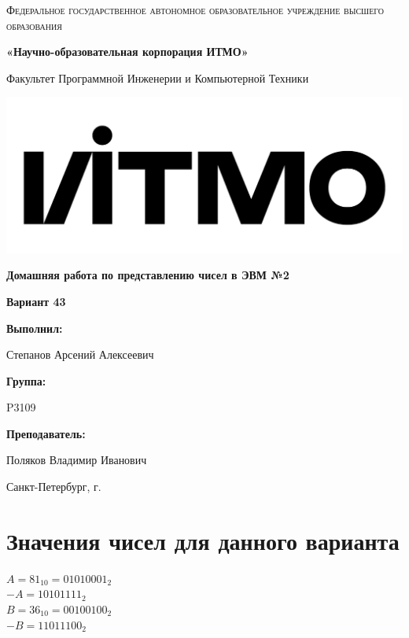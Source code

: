 \documentclass[12pt,a4paper]{report}
\begin{document}
\begin{titlepage}
	\centering
	{
        \scshape
        Федеральное государственное автономное образовательное учреждение высшего образования
        \par
        \textbf{«Научно-образовательная корпорация ИТМО»}
        \par
        \vspace*{1cm}
        Факультет Программной Инженерии и Компьютерной Техники
        \par
    }
    \vspace*{0.6cm}
    \includegraphics[width=\textwidth]{logo.png}
    {
        \Large
        \textbf{Домашняя работа по представлению чисел в ЭВМ №2}
        \par
        \normalsize
        \vspace*{0.75cm}
        \textbf{Вариант 43}
        \par
    }
    \vfill
    \hfill\begin{minipage}{\dimexpr\textwidth-7.8cm}
        \textbf{Выполнил:}\par
        Степанов Арсений Алексеевич\par
        \vspace*{0.15cm}
        \textbf{Группа:}\par
        P3109\par
        \vspace*{0.15cm}
        \textbf{Преподаватель:}\par
        Поляков Владимир Иванович\par
    \end{minipage}
    \vfill
    Санкт-Петербург, \the\year{}г.
\end{titlepage}
\section*{Значения чисел для данного варианта}
\onehalfspacing
$A=81_{10}=01010001_2$\\
$-A=10101111_2$\\
$B=36_{10}=00100100_2$\\
$-B=11011100_2$
\end{document}

